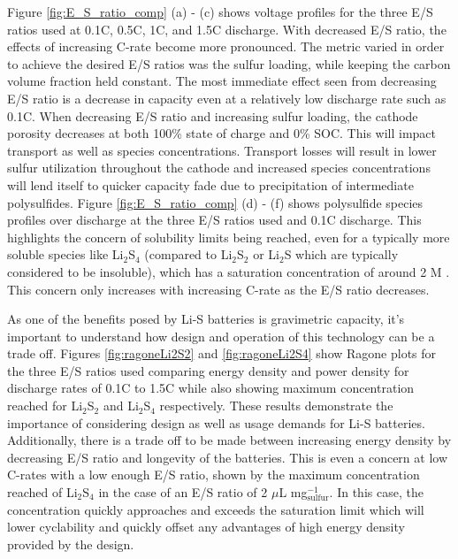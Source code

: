 \documentclass{elsarticle}
\begin{document}
Figure \ref{fig:E_S_ratio_comp} (a) - (c) shows voltage profiles for the three E/S ratios used at 0.1C, 0.5C, 1C, and 1.5C discharge. With decreased E/S ratio, the effects of increasing C-rate become more pronounced. The metric varied in order to achieve the desired E/S ratios was the sulfur loading, while keeping the carbon volume fraction held constant. The most immediate effect seen from decreasing E/S ratio is a decrease in capacity even at a relatively low discharge rate such as 0.1C. When decreasing E/S ratio and increasing sulfur loading, the cathode porosity decreases at both 100\% state of charge and 0\% SOC. This will impact transport as well as species concentrations. Transport losses will result in lower sulfur utilization throughout the cathode and increased species concentrations will lend itself to quicker capacity fade due to precipitation of intermediate polysulfides. Figure \ref{fig:E_S_ratio_comp} (d) - (f) shows polysulfide species profiles over discharge at the three E/S ratios used and 0.1C discharge. This highlights the concern of solubility limits being reached, even for a typically more soluble species like Li$_2$S$_4$ (compared to Li$_2$S$_2$ or Li$_2$S which are typically considered to be insoluble), which has a saturation concentration of around 2 M \cite{ANDREI2018469}. This concern only increases with increasing C-rate as the E/S ratio decreases. 

As one of the benefits posed by Li-S batteries is gravimetric capacity, it's important to understand how design and operation of this technology can be a trade off. Figures \ref{fig:ragoneLi2S2} and \ref{fig:ragoneLi2S4} show Ragone plots for the three E/S ratios used comparing energy density and power density for discharge rates of 0.1C to 1.5C while also showing maximum concentration reached for Li$_2$S$_2$ and Li$_2$S$_4$ respectively. These results demonstrate the importance of considering design as well as usage demands for Li-S batteries. Additionally, there is a trade off to be made between increasing energy density by decreasing E/S ratio and longevity of the batteries. This is even a concern at low C-rates with a low enough E/S ratio, shown by the maximum concentration reached of Li$_2$S$_4$ in the case of an E/S ratio of 2 $\mu$L mg$^{-1}_\mathrm{sulfur}$. In this case, the concentration quickly approaches and exceeds the saturation limit which will lower cyclability and quickly offset any advantages of high energy density provided by the design. 
\end{document}
